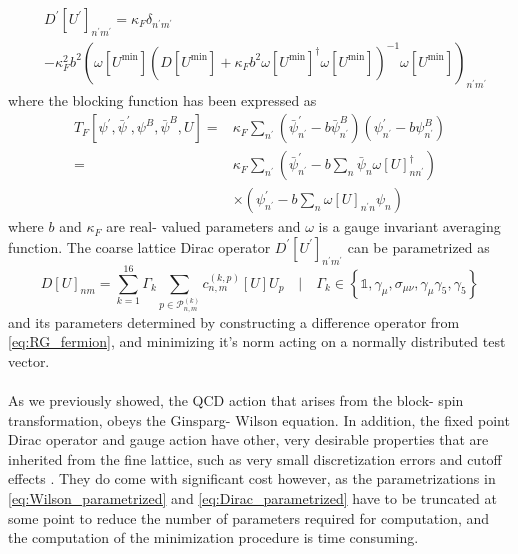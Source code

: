 \documentclass[a4paper,10pt]{article}
\begin{document}
\begin{equation}\label{eq:RG_fermion}
\begin{aligned}
&D^{\prime}\left[U^{\prime}\right]_{n^{\prime} m^{\prime}}=\kappa_{F} \delta_{n^{\prime} m^{\prime}} \\
&-\kappa_{F}^{2} b^{2}\left(\omega\left[U^{\min }\right]\left(D\left[U^{\min }\right]+\kappa_{F} b^{2} \omega\left[U^{\min }\right]^{\dagger} \omega\left[U^{\min }\right]\right)^{-1} \omega\left[U^{\min }\right]\right)_{n^{\prime} m^{\prime}}
\end{aligned}
\end{equation}
where the blocking function has been expressed as 
\begin{equation}
\begin{aligned}
T_{F}\left[\psi^{\prime}, \bar{\psi}^{\prime}, \psi^{B}, \bar{\psi}^{B}, U\right]=& \kappa_{F} \sum_{n^{\prime}}\left(\bar{\psi}_{n^{\prime}}^{\prime}-b \bar{\psi}_{n^{\prime}}^{B}\right)\left(\psi_{n^{\prime}}^{\prime}-b \psi_{n^{\prime}}^{B}\right) \\
=& \kappa_{F} \sum_{n^{\prime}}\left(\bar{\psi}_{n^{\prime}}^{\prime}-b \sum_{n} \bar{\psi}_{n} \omega[U]_{n n^{\prime}}^{\dagger}\right) \\
& \times\left(\psi_{n^{\prime}}^{\prime}-b \sum_{n} \omega[U]_{n^{\prime} n} \psi_{n}\right)
\end{aligned}
\end{equation}
where $b$ and $\kappa_F$ are real- valued parameters and $\omega$ is a gauge invariant averaging function. The coarse lattice Dirac operator $D^{\prime}\left[U^{\prime}\right]_{n^{\prime} m^{\prime}}$ can be parametrized as 
\begin{equation}\label{eq:Dirac_parametrized}
D[U]_{n m}=\sum_{k=1}^{16} \Gamma_{k} \sum_{p \in \mathcal{P}_{n, m}^{(k)}} c_{n, m}^{(k, p)}[U] U_{p} \quad\big|\quad \Gamma_k\in \left\{\mathbb{1}, \gamma_{\mu}, \sigma_{\mu \nu}, \gamma_{\mu} \gamma_{5}, \gamma_{5}\right\}
\end{equation}
and its parameters determined by constructing a difference operator from \eqref{eq:RG_fermion}, and minimizing it's norm acting on a normally distributed test vector.\\\\As we previously showed, the QCD action that arises from the block- spin transformation, obeys the Ginsparg- Wilson equation. In addition, the fixed point Dirac operator and gauge action have other, very desirable properties that are inherited from the fine lattice, such as very small discretization errors and cutoff effects \cite{HASENFRATZ199853}. They do come with significant cost however, as the parametrizations   in \eqref{eq:Wilson_parametrized} and \eqref{eq:Dirac_parametrized} have to be truncated at some point to reduce the number of parameters required for computation, and the computation of the minimization procedure is time consuming.
\end{document}
